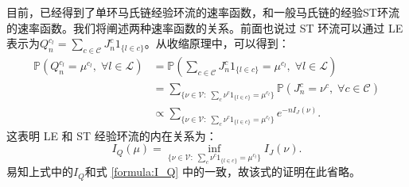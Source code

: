 
目前，已经得到了单环马氏链经验环流的速率函数，和一般马氏链的经验ST环流的速率函数。我们将阐述两种速率函数的关系。前面也说过 ST 环流可以通过 LE 表示为$Q_n^{c_l} = \sum_{c\in\mathcal{C}}J^c_n1_{\{l\in c\}}$。从收缩原理中，可以得到：
\begin{align*}
	\mathbb{P}\left(Q_n^{c_l}=\mu^{c_l},\;\forall l\in\mathcal{L}\right)
	&= \mathbb{P}\left(\sum_{c\in\mathcal{C}}J^c_n1_{\{l\in c\}}=\mu^{c_l},\;\forall l\in\mathcal{L}\right)\\
	&= \sum_{\{\nu\in\mathcal{V}:\;\sum_c\nu^c1_{\{l\in c\}}=\mu^{c_l}\}}
	\mathbb{P}\left(J^c_n=\nu^c,\;\forall c\in\mathcal{C}\right)\\
	&\propto \sum_{\{\nu\in\mathcal{V}:\;\sum_c\nu^c1_{\{l\in c\}}=\mu^{c_l}\}}e^{-nI_J(\nu)}.
\end{align*}
这表明 LE 和 ST 经验环流的内在关系为：
\begin{equation*}
	I_Q(\mu) = \inf_{\{\nu\in\mathcal{V}:\;\sum_c\nu^c1_{\{l\in c\}}=\mu^{c_l}\}}I_J(\nu).
\end{equation*}
易知上式中的$I_Q$和式 \eqref{formula:I_Q} 中的一致，故该式的证明在此省略。

